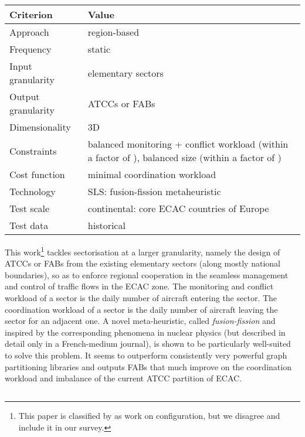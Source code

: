 \documentclass[a4paper,12pt]{article}
\begin{document}
\begin{center}
\begin{tabular}{|l|l|}
  \hline
  Criterion & Value \\
  \hline\hline
  Approach & region-based \\ \hline
  Frequency & static \\ \hline
  Input granularity & elementary sectors \\ \hline
  Output granularity & ATCCs or FABs \\ \hline
  Dimensionality & 3D \\ \hline
  Constraints & \parbox{11.5cm}{balanced monitoring + conflict
    workload (within a factor of ), balanced size (within a
    factor of )} \\ \hline
  Cost function & minimal coordination workload \\ \hline
  Technology & SLS: fusion-fission metaheuristic \\ \hline
  Test scale & continental:  core ECAC countries of Europe \\ \hline
  Test data & historical \\ \hline
\end{tabular}
\end{center}
This work\footnote{This paper is classified by \cite{Zelinski:DASC11}
  as work on configuration, but we disagree and include it in our
  survey.} tackles sectorisation at a larger granularity, namely the
design of ATCCs or FABs from the existing elementary sectors (along
mostly national boundaries), so as to enforce regional cooperation in
the seamless management and control of traffic flows in the ECAC zone.
The monitoring and conflict workload of a sector is the daily number
of aircraft entering the sector.  The coordination workload of a
sector is the daily number of aircraft leaving the sector for an
adjacent one.  A novel meta-heuristic, called \emph{fusion-fission}
and inspired by the corresponding phenomena in nuclear physics (but
described in detail only in a French-medium journal), is shown to be
particularly well-suited to solve this problem.  It seems to
outperform consistently very powerful graph partitioning libraries and
outputs FABs that much improve on the coordination workload and
imbalance of the current ATCC partition of ECAC.

\subsection{\cite{Conker:ATM07}}
\end{document}
